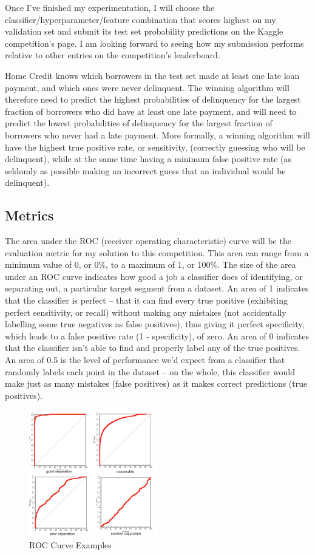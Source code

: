 \documentclass[12pt, letterpaper]{article}
\begin{document}
Once I've finished my experimentation, I will choose the classifier/hyperparameter/feature combination that scores highest on my validation set and submit its test set probability predictions on the Kaggle competition's page. I am looking forward to seeing how my submission performs relative to other entries on the competition's leaderboard.

Home Credit knows which borrowers in the test set made at least one late loan payment, and which ones were never delinquent. The winning algorithm will therefore need to predict the highest probabilities of delinquency for the largest fraction of borrowers who did have at least one late payment, and will need to predict the lowest probabilities of delinquency for the largest fraction of borrowers who never had a late payment. More formally, a winning algorithm will have the highest true positive rate, or sensitivity, (correctly guessing who will be delinquent), while at the same time having a minimum false positive rate (as seldomly as possible making an incorrect guess that an individual would be delinquent).

\subsection{Metrics}
The area under the ROC (receiver operating characteristic) curve\cite{wikipediaroc} will be the evaluation metric for my solution to this competition. This area can range from a minimum value of 0, or 0\%, to a maximum of 1, or 100\%. The size of the area under an ROC curve indicates how good a job a classifier does of identifying, or separating out, a particular target segment from a dataset. An area of 1 indicates that the classifier is perfect -- that it can find every true positive (exhibiting perfect sensitivity, or recall) without making any mistakes (not accidentally labelling some true negatives as false positives), thus giving it perfect specificity, which leads to a false positive rate (1 - specificity), of zero. An area of 0 indicates that the classifier isn't able to find and properly label any of the true positives. An area of 0.5 is the level of performance we'd expect from a classifier that randomly labels each point in the dataset -- on the whole, this classifier would make just as many mistakes (false positives) as it makes correct predictions (true positives).

\begin{figure}[ht]
\includegraphics[width=0.5\textwidth]{roccurves}
\centering
\caption{ROC Curve Examples\cite{mlwikirocanalysis}}
\end{figure}
\end{document}
